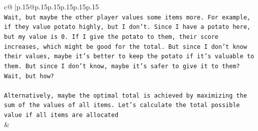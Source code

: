 \documentclass{article}
\begin{document}
{\begin{supertabular}{c@{$\;$}|p{.15\linewidth}@{}p{.15\linewidth}p{.15\linewidth}p{.15\linewidth}p{.15\linewidth}p{.15\linewidth}}
{{{\\ 
\texttt{Wait, but maybe the other player values some items more. For example, if they value potato highly, but I don't. Since I have a potato here, but my value is 0. If I give the potato to them, their score increases, which might be good for the total. But since I don't know their values, maybe it's better to keep the potato if it's valuable to them. But since I don't know, maybe it's safer to give it to them? Wait, but how?} \\
\\ 
\texttt{Alternatively, maybe the optimal total is achieved by maximizing the sum of the values of all items. Let's calculate the total possible value if all items are allocated} \\
            }
        }
    }
    & \\ \\


\end{supertabular}}
\end{document}
